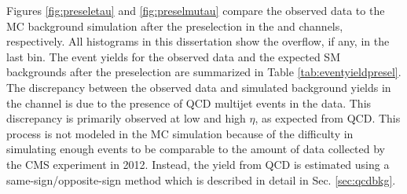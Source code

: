 Figures \ref{fig:preseletau} and \ref{fig:preselmutau} compare the observed data to the MC background simulation after the preselection in the \etau and \mutau channels, respectively. All histograms in this dissertation show the overflow, if any, in the last bin. The event yields for the observed data and the expected SM backgrounds after the preselection are summarized in Table \ref{tab:eventyieldpresel}. The discrepancy between the observed data and simulated background yields in the \etau channel is due to the presence of QCD multijet events in the data. This discrepancy is primarily observed at low \pt and high $\eta$, as expected from QCD. This process is not modeled in the MC simulation because of the difficulty in simulating enough events to be comparable to the amount of data collected by the CMS experiment in 2012. Instead, the yield from QCD is estimated using a same-sign/opposite-sign method which is described in detail in Sec. \ref{sec:qcdbkg}.

